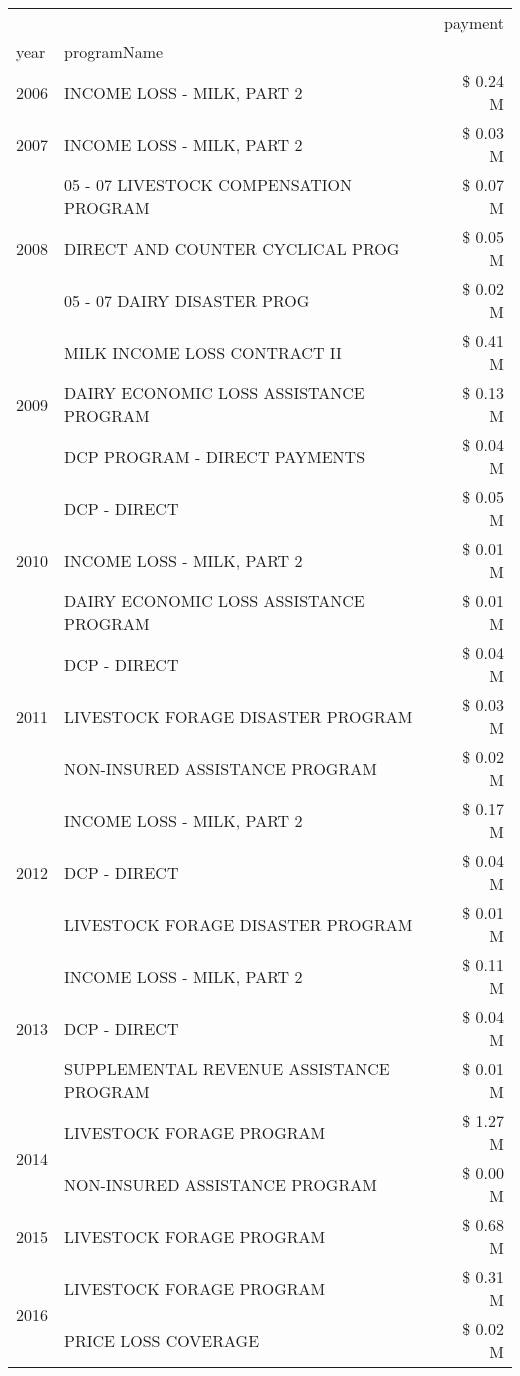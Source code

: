 \begin{tabular}{llr}
\toprule
 &  & payment \\
year & programName &  \\
\midrule
2006 & INCOME LOSS - MILK, PART 2 & \$ 0.24 M \\
\cline{1-3}
2007 & INCOME LOSS - MILK, PART 2 & \$ 0.03 M \\
\cline{1-3}
\multirow[t]{3}{*}{2008} & 05 - 07 LIVESTOCK COMPENSATION PROGRAM & \$ 0.07 M \\
 & DIRECT AND COUNTER CYCLICAL PROG & \$ 0.05 M \\
 & 05 - 07 DAIRY DISASTER PROG & \$ 0.02 M \\
\cline{1-3}
\multirow[t]{3}{*}{2009} & MILK INCOME LOSS CONTRACT II & \$ 0.41 M \\
 & DAIRY ECONOMIC LOSS ASSISTANCE PROGRAM & \$ 0.13 M \\
 & DCP PROGRAM - DIRECT PAYMENTS & \$ 0.04 M \\
\cline{1-3}
\multirow[t]{3}{*}{2010} & DCP - DIRECT & \$ 0.05 M \\
 & INCOME LOSS - MILK, PART 2 & \$ 0.01 M \\
 & DAIRY ECONOMIC LOSS ASSISTANCE PROGRAM & \$ 0.01 M \\
\cline{1-3}
\multirow[t]{3}{*}{2011} & DCP - DIRECT & \$ 0.04 M \\
 & LIVESTOCK FORAGE DISASTER PROGRAM & \$ 0.03 M \\
 & NON-INSURED ASSISTANCE PROGRAM & \$ 0.02 M \\
\cline{1-3}
\multirow[t]{3}{*}{2012} & INCOME LOSS - MILK, PART 2 & \$ 0.17 M \\
 & DCP - DIRECT & \$ 0.04 M \\
 & LIVESTOCK FORAGE DISASTER PROGRAM & \$ 0.01 M \\
\cline{1-3}
\multirow[t]{3}{*}{2013} & INCOME LOSS - MILK, PART 2 & \$ 0.11 M \\
 & DCP - DIRECT & \$ 0.04 M \\
 & SUPPLEMENTAL REVENUE ASSISTANCE PROGRAM & \$ 0.01 M \\
\cline{1-3}
\multirow[t]{2}{*}{2014} & LIVESTOCK FORAGE PROGRAM & \$ 1.27 M \\
 & NON-INSURED ASSISTANCE PROGRAM & \$ 0.00 M \\
\cline{1-3}
2015 & LIVESTOCK FORAGE PROGRAM & \$ 0.68 M \\
\cline{1-3}
\multirow[t]{3}{*}{2016} & LIVESTOCK FORAGE PROGRAM & \$ 0.31 M \\
 & PRICE LOSS COVERAGE & \$ 0.02 M \\

\end{tabular}
